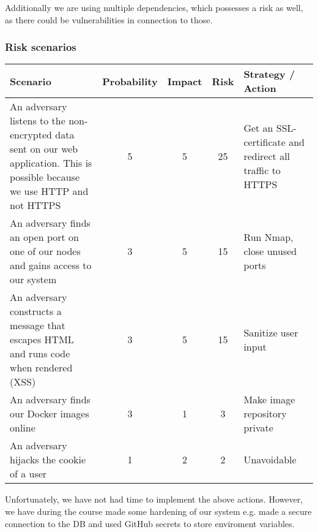 \noindent Additionally we are using multiple dependencies, which possesses a risk as well, as there could be vulnerabilities in connection to those. 

\subsubsection{Risk scenarios}

\begin{center}
\begin{tabular}{ |p{3.5cm}|c|c|c|p{2.5cm}| } 
 \hline
 Scenario & Probability & Impact & Risk & Strategy / Action\\ [0.5ex] 
 \hline
 An adversary listens to the non-encrypted data sent on our web application. This is possible because we use HTTP and not HTTPS
 & 5 & 5 & 25 & Get an SSL-certificate and redirect all traffic to HTTPS\\
\hline
 An adversary finds an open port on one of our nodes and gains access to our system & 3 & 5 & 15 & Run Nmap, close unused ports\\
 \hline 
 An adversary constructs a message that escapes HTML and runs code when rendered (XSS) & 3 & 5 & 15 & Sanitize user input\\
 \hline
  An adversary finds our Docker images online & 3 & 1 & 3 & Make image repository private\\ 
 \hline
 An adversary hijacks the cookie of a user & 1 & 2 & 2 & Unavoidable\\ 
 \hline
\end{tabular}
\end{center}

\noindent Unfortunately, we have not had time to implement the above actions. However, we have during the course made some hardening of our system e.g. made a secure connection to the DB and used GitHub secrets to store enviroment variables.